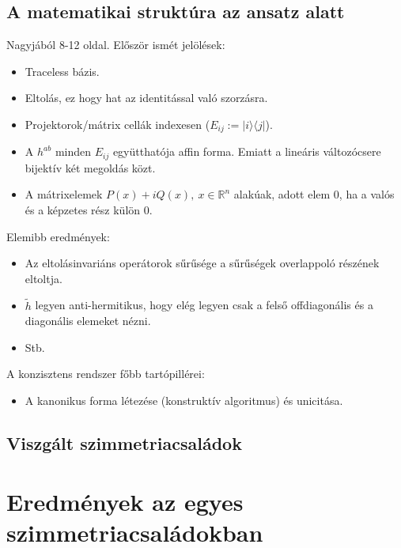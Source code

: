 \documentclass[12pt,a4paper,oneside]{report}
\newcommand{\hab}{h^{ab}}
\newcommand{\htil}{\tilde{h}}
\begin{document}
\section{A matematikai struktúra az ansatz alatt}
Nagyjából 8-12 oldal.
Először ismét jelölések:
\begin{itemize}
    \item Traceless bázis.
    \item Eltolás, ez hogy hat az identitással való szorzásra.
    \item Projektorok/mátrix cellák indexesen ($E_{ij}:=|i\rangle\langle j|$).
    \item A $\hab$ minden $E_{ij}$ együtthatója affin forma. Emiatt a lineáris változócsere bijektív két megoldás közt.
    \item A mátrixelemek $P(x)+iQ(x),\ x\in \mathbb{R}^n$ alakúak, adott elem 0, ha a valós és a képzetes rész külön 0.
\end{itemize}
Elemibb eredmények:
\begin{itemize}
    \item Az eltolásinvariáns operátorok sűrűsége a sűrűségek overlappoló részének eltoltja.
    \item $\htil$ legyen anti-hermitikus, hogy elég legyen csak a felső offdiagonális és a diagonális elemeket nézni.
    \item Stb.
\end{itemize}
A konzisztens rendszer főbb tartópillérei:
\begin{itemize}
    \item A kanonikus forma létezése (konstruktív algoritmus) és unicitása.
\end{itemize}


\section{Viszgált szimmetriacsaládok}

\chapter{Eredmények az egyes szimmetriacsaládokban}

\end{document}
